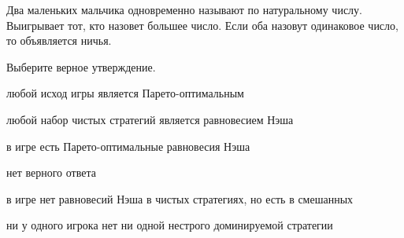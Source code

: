 
\begin{question}
Два маленьких мальчика одновременно называют по натуральному числу.
Выигрывает тот, кто назовет большее число.
Если оба назовут одинаковое число, то объявляется ничья.

Выберите верное утверждение.
\begin{answerlist}
  \item любой исход игры является Парето-оптимальным
  \item любой набор чистых стратегий является равновесием Нэша
  \item в игре есть Парето-оптимальные равновесия Нэша
  \item нет верного ответа
  \item в игре нет равновесий Нэша в чистых стратегиях, но есть в смешанных
  \item ни у одного игрока нет ни одной нестрого доминируемой стратегии
\end{answerlist}
\end{question}


